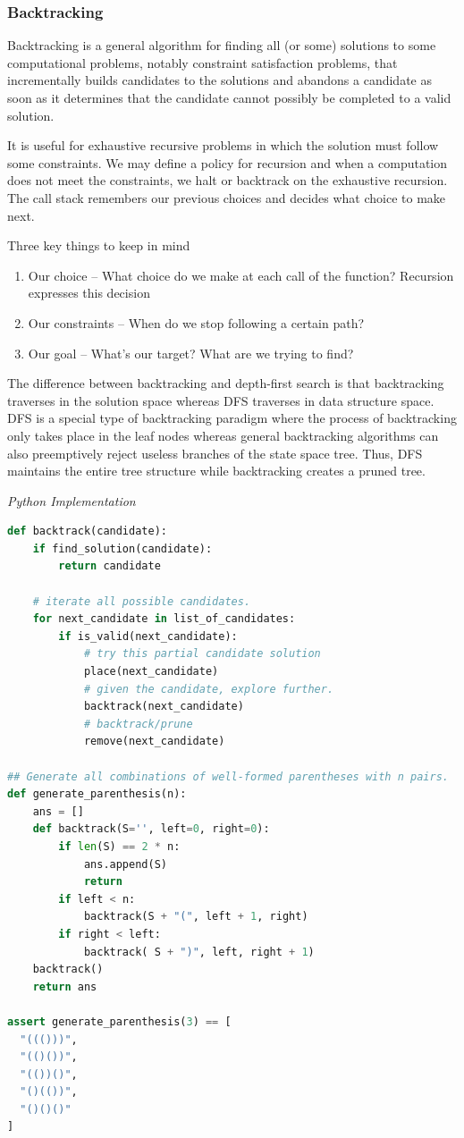 \documentclass{article}
\begin{document}
    \subsubsection{Backtracking}
    Backtracking is a general algorithm for finding all (or some) solutions to some computational problems, notably constraint satisfaction problems, that incrementally builds candidates to the solutions and abandons a candidate as soon as it determines that the candidate cannot possibly be completed to a valid solution. 
    
    It is useful for exhaustive recursive problems in which the solution must follow some constraints. We may define a policy for recursion and when a computation does not meet the constraints, we halt or backtrack on the exhaustive recursion. The call stack remembers our previous choices and decides what choice to make next.
    
    Three key things to keep in mind
    \begin{enumerate}
        \item Our choice -- What choice do we make at each call of the function? Recursion expresses this decision
        \item Our constraints -- When do we stop following a certain path?
        \item Our goal -- What's our target? What are we trying to find?
    \end{enumerate}
    

    The difference between backtracking and depth-first search is that backtracking traverses in the solution space whereas DFS traverses in data structure space. DFS is a special type of backtracking paradigm where the process of backtracking only takes place in the leaf nodes whereas general backtracking algorithms can also preemptively reject useless branches of the state space tree. Thus, DFS maintains the entire tree structure while backtracking creates a pruned tree.
    
\vspace{8pt} \emph{Python Implementation}
\begin{lstlisting}[language=Python]
def backtrack(candidate):
    if find_solution(candidate):
        return candidate
    
    # iterate all possible candidates.
    for next_candidate in list_of_candidates:
        if is_valid(next_candidate):
            # try this partial candidate solution
            place(next_candidate)
            # given the candidate, explore further.
            backtrack(next_candidate)
            # backtrack/prune
            remove(next_candidate)
            
## Generate all combinations of well-formed parentheses with n pairs.
def generate_parenthesis(n):
    ans = []
    def backtrack(S='', left=0, right=0):
        if len(S) == 2 * n:
            ans.append(S)
            return
        if left < n:
            backtrack(S + "(", left + 1, right)
        if right < left:
            backtrack( S + ")", left, right + 1)
    backtrack()    
    return ans
    
assert generate_parenthesis(3) == [
  "((()))",
  "(()())",
  "(())()",
  "()(())",
  "()()()"
]
\end{lstlisting}
    
\end{document}
